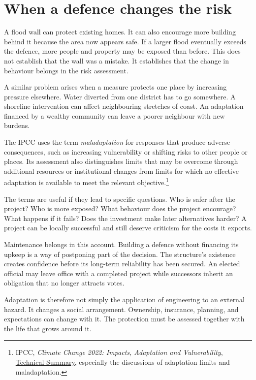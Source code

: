 \documentclass[12pt,a4paper]{book}
\begin{document}
\section*{When a defence changes the risk}

A flood wall can protect existing homes. It can also encourage more building behind it because the area now appears safe. If a larger flood eventually exceeds the defence, more people and property may be exposed than before. This does not establish that the wall was a mistake. It establishes that the change in behaviour belongs in the risk assessment.

A similar problem arises when a measure protects one place by increasing pressure elsewhere. Water diverted from one district has to go somewhere. A shoreline intervention can affect neighbouring stretches of coast. An adaptation financed by a wealthy community can leave a poorer neighbour with new burdens.

The IPCC uses the term \emph{maladaptation} for responses that produce adverse consequences, such as increasing vulnerability or shifting risks to other people or places. Its assessment also distinguishes limits that may be overcome through additional resources or institutional changes from limits for which no effective adaptation is available to meet the relevant objective.\footnote{IPCC, \emph{Climate Change 2022: Impacts, Adaptation and Vulnerability}, \href{https://www.ipcc.ch/report/ar6/wg2/chapter/technical-summary/?lang=en}{Technical Summary}, especially the discussions of adaptation limits and maladaptation.}

The terms are useful if they lead to specific questions. Who is safer after the project? Who is more exposed? What behaviour does the project encourage? What happens if it fails? Does the investment make later alternatives harder? A project can be locally successful and still deserve criticism for the costs it exports.

Maintenance belongs in this account. Building a defence without financing its upkeep is a way of postponing part of the decision. The structure's existence creates confidence before its long-term reliability has been secured. An elected official may leave office with a completed project while successors inherit an obligation that no longer attracts votes.

Adaptation is therefore not simply the application of engineering to an external hazard. It changes a social arrangement. Ownership, insurance, planning, and expectations can change with it. The protection must be assessed together with the life that grows around it.
\end{document}
